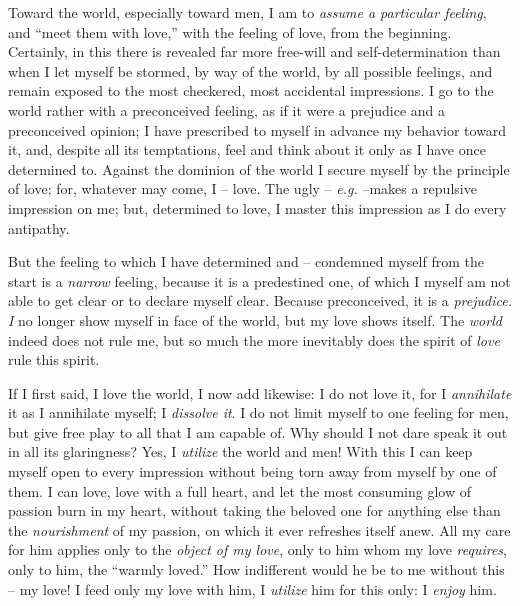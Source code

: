 Toward the world, especially toward men, I am to \textit{assume a particular 
feeling}, and ``meet them with love,'' with the feeling of love, from the 
beginning. Certainly, in this there is revealed far more free-will and 
self-determination than when I let myself be stormed, by way of the world, by 
all possible feelings, and remain exposed to the most checkered, most 
accidental impressions. I go to the world rather with a preconceived feeling, 
as if it were a prejudice and a preconceived opinion; I have prescribed to 
myself in advance my behavior toward it, and, despite all its temptations, 
feel and think about it only as I have once determined to. Against the 
dominion of the world I secure myself by the principle of love; for, whatever 
may come, I -- love. The ugly -- \textit{e.g.} --makes a repulsive impression 
on me; but, determined to love, I master this impression as I do every 
antipathy.

But the feeling to which I have determined and -- condemned myself from the 
start is a \textit{narrow} feeling, because it is a predestined one, of which 
I myself am not able to get clear or to declare myself clear. Because 
preconceived, it is a \textit{prejudice. I} no longer show myself in face of 
the world, but my love shows itself. The \textit{world} indeed does not rule 
me, but so much the more inevitably does the spirit of \textit{love} rule this 
spirit.

If I first said, I love the world, I now add likewise: I do not love it, for I 
\textit{annihilate} it as I annihilate myself; I \textit{dissolve it}. I do 
not limit myself to one feeling for men, but give free play to all that I am 
capable of. Why should I not dare speak it out in all its glaringness? Yes, I 
\textit{utilize} the world and men! With this I can keep myself open to every 
impression without being torn away from myself by one of them. I can love, 
love with a full heart, and let the most consuming glow of passion burn in my 
heart, without taking the beloved one for anything else than the 
\textit{nourishment} of my passion, on which it ever refreshes itself anew. 
All my care for him applies only to the \textit{object of my love}, only to 
him whom my love \textit{requires}, only to him, the ``warmly loved.'' How 
indifferent would he be to me without this -- my love! I feed only my love 
with him, I \textit{utilize} him for this only: I \textit{enjoy} him.

